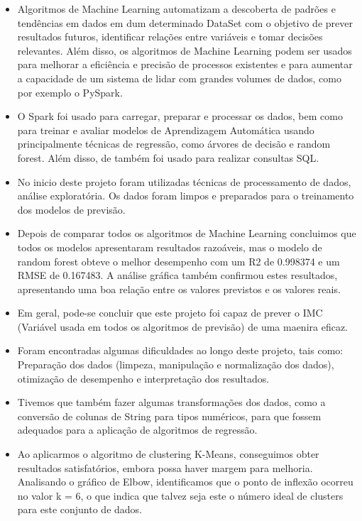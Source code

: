 \documentclass[11pt]{article}
\providecommand{\tightlist}{%
      \setlength{\itemsep}{0pt}\setlength{\parskip}{0pt}}
\begin{document}
   \begin{itemize}
\tightlist
\item
    Algoritmos de Machine Learning automatizam a descoberta de padrões e tendências em dados em dum determinado DataSet com o objetivo de prever resultados futuros, identificar relações entre variáveis e tomar decisões relevantes.
    Além disso, os algoritmos de Machine Learning podem ser usados para melhorar a eficiência e precisão de processos existentes e para aumentar a capacidade de um sistema de lidar com grandes volumes de dados, como por exemplo o PySpark.
    \item
    O Spark foi usado para carregar, preparar e processar os dados, bem como para treinar e avaliar modelos de Aprendizagem Automática usando principalmente técnicas de regressão, como árvores de decisão e random forest. Além disso, de também foi usado para realizar consultas SQL.
    \item
    No inicio deste projeto foram utilizadas técnicas de processamento de dados, análise exploratória. Os dados foram limpos e preparados para o treinamento dos modelos de previsão.
    \item
    Depois de comparar todos os algoritmos de Machine Learning concluimos que todos os modelos apresentaram resultados razoáveis, mas o modelo de random forest obteve o melhor desempenho com um R2 de 0.998374 e um RMSE de 0.167483. A análise gráfica também confirmou estes resultados, apresentando uma boa relação entre os valores previstos e os valores reais.
    \item
    Em geral, pode-se concluir que este projeto foi capaz de prever o IMC (Variável usada em todos os algoritmos de previsão) de uma maenira eficaz.
    \item
    Foram encontradas algumas dificuldades ao longo deste projeto, tais como: Preparação dos dados (limpeza, manipulação e normalização dos dados), otimização de desempenho e interpretação dos resultados.
    \item
    Tivemos que também fazer algumas transformações dos dados, como a conversão de colunas de String para tipos numéricos, para que fossem adequados para a aplicação de algoritmos de regressão.
    \item
    Ao aplicarmos o algoritmo de clustering K-Means, conseguimos obter resultados satisfatórios, embora possa haver margem para melhoria. Analisando o gráfico de Elbow, identificamos que o ponto de inflexão ocorreu no valor k = 6, o que indica que talvez seja este o número ideal de clusters para este conjunto de dados.
\end{itemize}
\end{document}
